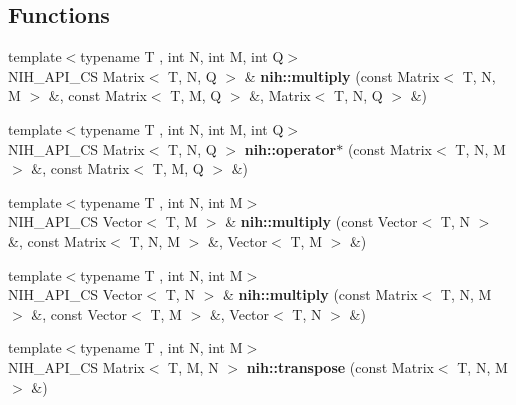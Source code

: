 \subsection*{\-Functions}
\begin{DoxyCompactItemize}
\item 
\hypertarget{group__matrices_ga9d891cd64a82aefc62f28dca0061a99f}{
{\footnotesize template$<$typename T , int \-N, int \-M, int \-Q$>$ }\\\-N\-I\-H\-\_\-\-A\-P\-I\-\_\-\-C\-S \-Matrix$<$ \-T, \-N, \-Q $>$ \& {\bfseries nih\-::multiply} (const \-Matrix$<$ \-T, \-N, \-M $>$ \&, const \-Matrix$<$ \-T, \-M, \-Q $>$ \&, \-Matrix$<$ \-T, \-N, \-Q $>$ \&)}
\label{group__matrices_ga9d891cd64a82aefc62f28dca0061a99f}

\item 
\hypertarget{group__matrices_gae27c9ec1c67d6ccc566ccef54d6134ec}{
{\footnotesize template$<$typename T , int \-N, int \-M, int \-Q$>$ }\\\-N\-I\-H\-\_\-\-A\-P\-I\-\_\-\-C\-S \-Matrix$<$ \-T, \-N, \-Q $>$ {\bfseries nih\-::operator$\ast$} (const \-Matrix$<$ \-T, \-N, \-M $>$ \&, const \-Matrix$<$ \-T, \-M, \-Q $>$ \&)}
\label{group__matrices_gae27c9ec1c67d6ccc566ccef54d6134ec}

\item 
\hypertarget{group__matrices_ga3b402229a02f14d9742452c586f5215d}{
{\footnotesize template$<$typename T , int \-N, int \-M$>$ }\\\-N\-I\-H\-\_\-\-A\-P\-I\-\_\-\-C\-S \-Vector$<$ \-T, \-M $>$ \& {\bfseries nih\-::multiply} (const \-Vector$<$ \-T, \-N $>$ \&, const \-Matrix$<$ \-T, \-N, \-M $>$ \&, \-Vector$<$ \-T, \-M $>$ \&)}
\label{group__matrices_ga3b402229a02f14d9742452c586f5215d}

\item 
\hypertarget{group__matrices_ga0f199ec8806602a51e72f64b9ee2860c}{
{\footnotesize template$<$typename T , int \-N, int \-M$>$ }\\\-N\-I\-H\-\_\-\-A\-P\-I\-\_\-\-C\-S \-Vector$<$ \-T, \-N $>$ \& {\bfseries nih\-::multiply} (const \-Matrix$<$ \-T, \-N, \-M $>$ \&, const \-Vector$<$ \-T, \-M $>$ \&, \-Vector$<$ \-T, \-N $>$ \&)}
\label{group__matrices_ga0f199ec8806602a51e72f64b9ee2860c}

\item 
\hypertarget{group__matrices_ga3585b1336ed34f070bbffd8904057a72}{
{\footnotesize template$<$typename T , int \-N, int \-M$>$ }\\\-N\-I\-H\-\_\-\-A\-P\-I\-\_\-\-C\-S \-Matrix$<$ \-T, \-M, \-N $>$ {\bfseries nih\-::transpose} (const \-Matrix$<$ \-T, \-N, \-M $>$ \&)}
\label{group__matrices_ga3585b1336ed34f070bbffd8904057a72}


\end{DoxyCompactItemize}
